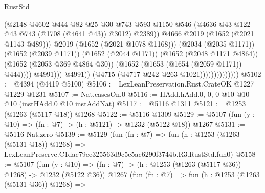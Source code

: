 \begin{lexlean}{RustStd}
\begin{coremodule}
                                                (@2148
                                                  @4602
                                                  @444
                                                  @82
                                                  @25
                                                  @30
                                                  @743
                                                  @593
                                                  @1150
                                                  @546
                                                  (@4636
                                                    @43
                                                    @122
                                                    @43
                                                    @743
                                                    (@1708 (@4641 @43))
                                                    @3012)
                                                  @2389))
                                              @4666
                                              @2019
                                              (@1652 (@2021 @1143 @489)))
                                            @2019
                                            (@1652 (@2021 @1078 @1168)))
                                          (@2034 (@2035 @1171))
                                          (@1652 (@2039 @1171))
                                          (@1652 (@2044 @1171))
                                          (@1652 (@2048 @1171 @4864))
                                          (@1652 (@2053 @369 @4864 @30))
                                          (@1652 (@1653 (@1654 (@2059 @1171)) @444))))
                                      @4991)))
                                @4991))
                            (@4715 (@4717 @242 @263 @1021))))))))))))))
@5102 := @4394 (@4419 @5100)
@5106 := LexLeanPreservation.Rust.CrateOK @1227 @1229 @1231
@5107 := Nat.casesOn.{0}
@5116 := HAdd.hAdd.{0, 0, 0} @10 @10 @10 (instHAdd.{0} @10 instAddNat)
@5117 := @5116 @1311
@5121 := @1253 (@1263 (@5117 @18)) @1268
@5122 := @5116 @1309
@5129 := @5107 (fun (y : @10) => (fn : @7) -> (h : @5121) -> @1232 (@5122 @18)) @1267
@5131 := @5116 Nat.zero
@5139 := @5129
    (fun (fn : @7) =>
    fun (h : @1253 (@1263 (@5131 @18)) @1268) =>
    LexLeanPreserve.C1dac79ee325563d9c5e5ac6290f3744b.R3.RustStd.fun0)
@5158 := @5107
    (fun (y : @10) => (fn : @7) -> (h : @1253 (@1263 (@5117 @36)) @1268) -> @1232 (@5122 @36))
    @1267
    (fun (fn : @7) =>
    fun (h : @1253 (@1263 (@5131 @36)) @1268) =>

\end{coremodule}
\end{lexlean}
